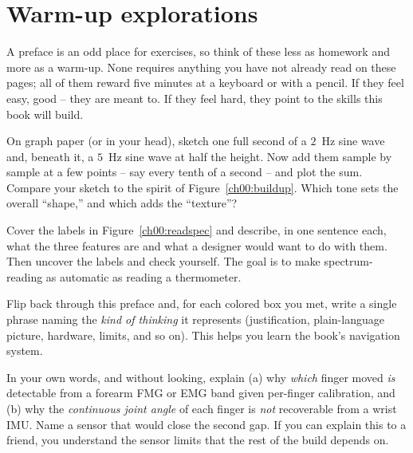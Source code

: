 \section*{Warm-up explorations}

A preface is an odd place for exercises, so think of these less as homework and more as a
warm-up. None requires anything you have not already read
on these pages; all of them reward five minutes at a keyboard or with a pencil. If they feel
easy, good -- they are meant to. If they feel hard, they point to the skills this book
will build.

\begin{exercise}
On graph paper (or in your head), sketch one full second of a $2$~Hz sine wave and, beneath it,
a $5$~Hz sine wave at half the height. Now add them sample by sample at a few points -- say every
tenth of a second -- and plot the sum. Compare your sketch to the spirit of
Figure~\ref{ch00:buildup}. Which tone sets the overall ``shape,'' and which adds the ``texture''?
\end{exercise}

\begin{exercise}
Cover the labels in Figure~\ref{ch00:readspec} and describe, in one sentence each, what the
three features are and what a designer would want to do with them. Then uncover the labels and
check yourself. The goal is to make spectrum-reading as automatic as reading a thermometer.
\end{exercise}

\begin{exercise}
Flip back through this preface and, for each colored box you met, write a single phrase naming
the \emph{kind of thinking} it represents (justification, plain-language picture, hardware,
limits, and so on). This helps you learn the book's navigation system.
\end{exercise}

\begin{exercise}
In your own words, and without looking, explain (a) why \emph{which} finger moved \emph{is}
detectable from a forearm FMG or EMG band given per-finger calibration, and (b) why the
\emph{continuous joint angle} of each finger is \emph{not} recoverable from a wrist IMU.
Name a sensor that would close the second gap. If you can explain this to a friend, you understand the
sensor limits that the rest of the build depends on.
\end{exercise}

